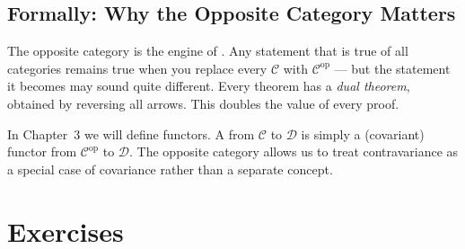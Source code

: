 \subsection{Formally: Why the Opposite Category Matters}

The opposite category is the engine of . Any
statement that is true of all categories remains true when you replace every
$\mathcal{C}$ with $\mathcal{C}^{\mathrm{op}}$ --- but the statement it
becomes may sound quite different. Every theorem has a \emph{dual theorem},
obtained by reversing all arrows. This doubles the value of every proof.

In Chapter~3 we will define functors. A  from
$\mathcal{C}$ to $\mathcal{D}$ is simply a (covariant) functor from
$\mathcal{C}^{\mathrm{op}}$ to $\mathcal{D}$. The opposite category allows
us to treat contravariance as a special case of covariance rather than a
separate concept.


\section*{Exercises}

